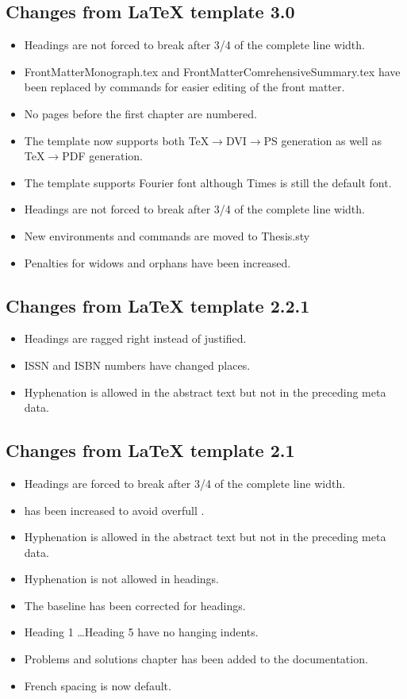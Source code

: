 \subsection{Changes from \LaTeX{} template 3.0}
\begin{itemize}
	\item Headings are not forced to break after 3/4 of the complete line width.
	\item FrontMatterMonograph.tex and FrontMatterComrehensiveSummary.tex have been replaced by commands for easier editing of the front matter.
	\item No pages before the first chapter are numbered.
	\item The template now supports both \TeX\(\rightarrow\)DVI\(\rightarrow\)PS generation as well as \TeX\(\rightarrow\)PDF generation.
	\item The template supports Fourier font although Times is still the default font.
	\item Headings are not forced to break after 3/4 of the complete line width.
	\item New environments and commands are moved to Thesis.sty
	\item Penalties for widows and orphans have been increased.
\end{itemize}

\subsection{Changes from \LaTeX{} template 2.2.1}
\begin{itemize}
	\item Headings are ragged right instead of justified.
	\item ISSN and ISBN numbers have changed places.
	\item Hyphenation is allowed in the abstract text but not in the preceding meta data.
\end{itemize}

\subsection{Changes from \LaTeX{} template 2.1}
\begin{itemize}
    \item Headings are forced to break after 3/4 of the complete line width.
    \item {} has been increased to avoid overfull .
    \item Hyphenation is allowed in the abstract text but not in the preceding meta data.
    \item Hyphenation is not allowed in headings.
    \item The baseline has been corrected for headings.
    \item Heading 1 \ldots Heading 5 have no hanging indents.
    \item Problems and solutions chapter has been added to the documentation.
    \item French spacing is now default.
\end{itemize}


